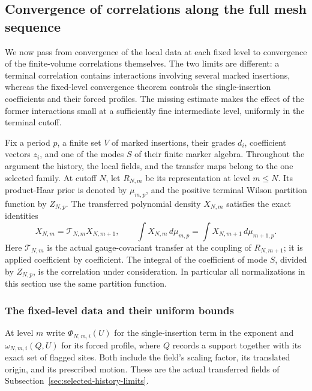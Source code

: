 \subsection{Convergence of correlations along the full mesh sequence}
\label{sec:fullmesh-correlation-cauchy}
We now pass from convergence of the local data at each fixed level to
convergence of the finite-volume correlations themselves. The two limits
are different: a terminal correlation contains interactions involving
several marked insertions, whereas the fixed-level convergence theorem
controls the single-insertion coefficients and their forced profiles.
The missing estimate makes the effect of the former interactions small
at a sufficiently fine intermediate level, uniformly in the terminal
cutoff.

Fix a period $p$, a finite set $V$ of marked insertions, their grades
$d_i$, coefficient vectors $z_i$, and one of the modes $S$ of their
finite marker algebra. Throughout the argument the history, the local
fields, and the transfer maps belong to the one selected family.
At cutoff $N$, let $R_{N,m}$ be its representation at level $m\le N$.
Its product-Haar prior is denoted by $\mu_{m,p}$, and the positive
terminal Wilson partition function by $Z_{N,p}$. The transferred
polynomial density $X_{N,m}$ satisfies the exact identities
\[
 X_{N,m}=\mathcal T_{N,m}X_{N,m+1},\qquad
 \int X_{N,m}\,d\mu_{m,p}
       =\int X_{N,m+1}\,d\mu_{m+1,p}.
\]
Here $\mathcal T_{N,m}$ is the actual gauge-covariant transfer at the
coupling of $R_{N,m+1}$; it is applied coefficient by coefficient.
The integral of the coefficient of mode $S$, divided by $Z_{N,p}$, is the correlation
under consideration. In particular all normalizations in this section
use the same partition function.

\subsubsection{The fixed-level data and their uniform bounds}
At level $m$ write $\Phi_{N,m,i}(U)$ for the single-insertion term in
the exponent and $\omega_{N,m,i}(Q,U)$ for its forced profile, where
$Q$ records a support together with its exact set of flagged sites.
Both include the field's scaling factor, its translated origin, and
its prescribed motion. These are the actual transferred fields of
Subsection~\ref{sec:selected-history-limits}.

